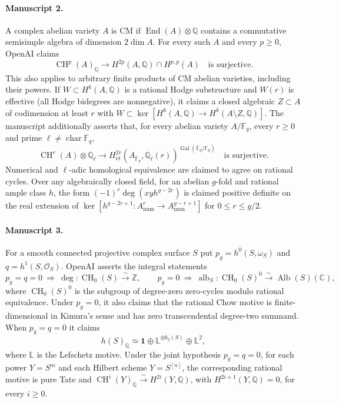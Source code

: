 \documentclass[11pt]{article}
\begin{document}
\paragraph{Manuscript 2.}
A complex abelian variety $A$ is CM if $\operatorname{End}(A)\otimes\mathbb Q$ contains a commutative semisimple algebra of dimension $2\dim A$. For every such $A$ and every $p\ge0$, OpenAI claims
\[
\operatorname{CH}^p(A)_{\mathbb Q}\longrightarrow H^{2p}(A,\mathbb Q)\cap H^{p,p}(A)
\quad\text{is surjective}.
\]
This also applies to arbitrary finite products of CM abelian varieties, including their powers. If $W\subset H^k(A,\mathbb Q)$ is a rational Hodge substructure and $W(r)$ is effective (all Hodge bidegrees are nonnegative), it claims a closed algebraic $Z\subset A$ of codimension at least $r$ with $W\subset\ker[H^k(A,\mathbb Q)\to H^k(A\setminus Z,\mathbb Q)]$.
The manuscript additionally asserts that, for every abelian variety $A/\mathbb F_q$, every $r\ge0$ and prime $\ell\ne\operatorname{char}\mathbb F_q$,
\[
\operatorname{CH}^r(A)\otimes\mathbb Q_\ell\longrightarrow
H^{2r}_{\mathrm{\acute et}}(A_{\overline{\mathbb F}_q},\mathbb Q_\ell(r))^{\operatorname{Gal}(\overline{\mathbb F}_q/\mathbb F_q)}
\quad\text{is surjective}.
\]
Numerical and $\ell$-adic homological equivalence are claimed to agree on rational cycles. Over any algebraically closed field, for an abelian $g$-fold and rational ample class $h$, the form $(-1)^r\deg(xyh^{g-2r})$ is claimed positive definite on the real extension of $\ker[h^{g-2r+1}:A^r_{\mathrm{num}}\to A^{g-r+1}_{\mathrm{num}}]$ for $0\le r\le g/2$.

\paragraph{Manuscript 3.}
For a smooth connected projective complex surface $S$ put $p_g=h^0(S,\omega_S)$ and $q=h^1(S,\mathcal O_S)$. OpenAI asserts the integral statements
\[
p_g=q=0\ \Longrightarrow\ \deg:\operatorname{CH}_0(S)\xrightarrow{\sim}\mathbb Z,
\qquad
p_g=0\ \Longrightarrow\ \operatorname{alb}_S:\operatorname{CH}_0(S)^0\xrightarrow{\sim}\operatorname{Alb}(S)(\mathbb C),
\]
where $\operatorname{CH}_0(S)^0$ is the subgroup of degree-zero zero-cycles modulo rational equivalence. Under $p_g=0$, it also claims that the rational Chow motive is finite-dimensional in Kimura's sense and has zero transcendental degree-two summand. When $p_g=q=0$ it claims
\[
h(S)_{\mathbb Q}\simeq\mathbf1\oplus\mathbb L^{\oplus b_2(S)}\oplus\mathbb L^2,
\]
where $\mathbb L$ is the Lefschetz motive. Under the joint hypothesis $p_g=q=0$, for each power $Y=S^m$ and each Hilbert scheme $Y=S^{[n]}$, the corresponding rational motive is pure Tate and $\operatorname{CH}^i(Y)_{\mathbb Q}\xrightarrow{\sim}H^{2i}(Y,\mathbb Q)$, with $H^{2i+1}(Y,\mathbb Q)=0$, for every $i\ge0$.
\end{document}
